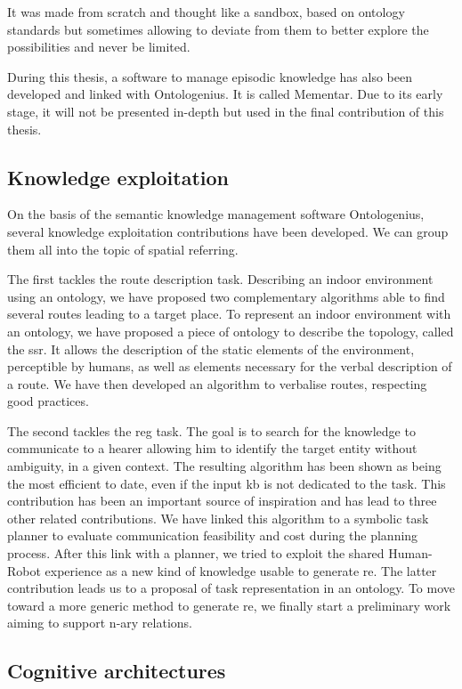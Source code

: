 It was made from scratch and thought like a sandbox, based on ontology standards but sometimes allowing to deviate from them to better explore the possibilities and never be limited.

During this thesis, a software to manage episodic knowledge has also been developed and linked with Ontologenius. It is called Mementar. Due to its early stage, it will not be presented in-depth but used in the final contribution of this thesis. 

\subsection{Knowledge exploitation}

On the basis of the semantic knowledge management software Ontologenius, several knowledge exploitation contributions have been developed. We can group them all into the topic of spatial referring.

The first tackles the route description task. Describing an indoor environment using an ontology, we have proposed two complementary algorithms able to find several routes leading to a target place. To represent an indoor environment with an ontology, we have proposed a piece of ontology to describe the topology, called the \acrlong{ssr}. It allows the description of the static elements of the environment, perceptible by humans, as well as elements necessary for the verbal description of a route. We have then developed an algorithm to verbalise routes, respecting good practices.

The second tackles the \acrlong{reg} task. The goal is to search for the knowledge to communicate to a hearer allowing him to identify the target entity without ambiguity, in a given context. The resulting algorithm has been shown as being the most efficient to date, even if the input \acrshort{kb} is not dedicated to the task. This contribution has been an important source of inspiration and has lead to three other related contributions. We have linked this algorithm to a symbolic task planner to evaluate communication feasibility and cost during the planning process. After this link with a planner, we tried to exploit the shared Human-Robot experience as a new kind of knowledge usable to generate \acrlong{re}. The latter contribution leads us to a proposal of task representation in an ontology. To move toward a more generic method to generate \acrlong{re}, we finally start a preliminary work aiming to support n-ary relations.

\subsection{Cognitive architectures}

